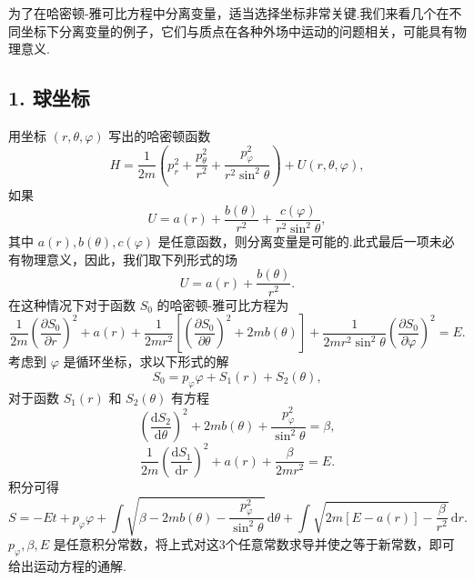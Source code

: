 为了在哈密顿-雅可比方程中分离变量，适当选择坐标非常关键.我们来看几个在不同坐标下分离变量的例子，它们与质点在各种外场中运动的问题相关，可能具有物理意义.

\subsection*{1. 球坐标}

用坐标 $(r,\theta,\varphi)$ 写出的哈密顿函数
\begin{equation*}
  H=\frac{1}{2m}\left(p_r^2+\frac{p_\theta^2}{r^2}
  +\frac{p_\varphi^2}{r^2\sin^2\theta}\right)+U(r,\theta,\varphi),
\end{equation*}
如果
\begin{equation*}
  U=a(r)+\frac{b(\theta)}{r^2}
  +\frac{c(\varphi)}{r^2\sin^2\theta},
\end{equation*}
其中 $a(r),b(\theta),c(\varphi)$
是任意函数，则分离变量是可能的.此式最后一项未必有物理意义，因此，我们取下列形式的场
\begin{equation}
  U=a(r)+\frac{b(\theta)}{r^2}.
\end{equation}
在这种情况下对于函数 $S_0$ 的哈密顿-雅可比方程为
\begin{equation*}
  \frac{1}{2m}\left(\frac{\partial S_0}{\partial r}\right)^2+a(r)
  +\frac{1}{2mr^2}\left[\left(\frac{\partial S_0}{\partial\theta}\right)^2
  +2mb(\theta)\right]
  +\frac{1}{2mr^2\sin^2\theta}\left(\frac{\partial S_0}{\partial\varphi}\right)^2
  =E.
\end{equation*}
考虑到 $\varphi$ 是循环坐标，求以下形式的解
\begin{equation*}
  S_0=p_\varphi\varphi+S_1(r)+S_2(\theta),
\end{equation*}
对于函数 $S_1(r)$ 和 $S_2(\theta)$ 有方程
\begin{equation*}
  \left(\frac{\mathrm{d}S_2}{\mathrm{d}\theta}\right)^2+2mb(\theta)
  +\frac{p_\varphi^2}{\sin^2\theta}=\beta,
\end{equation*}
\begin{equation*}
  \frac{1}{2m}\left(\frac{\mathrm{d}S_1}{\mathrm{d}r}\right)^2+a(r)
  +\frac{\beta}{2mr^2}=E.
\end{equation*}
积分可得
\begin{equation}
  S=-Et+p_\varphi\varphi
  +\int\sqrt{\beta-2mb(\theta)-\frac{p_\varphi^2}{\sin^2\theta}}\,\mathrm{d}\theta
  +\int\sqrt{2m[E-a(r)]-\frac{\beta}{r^2}}\,\mathrm{d}r.
\end{equation}
$p_\varphi,\beta,E$
是任意积分常数，将上式对这3个任意常数求导并使之等于新常数，即可给出运动方程的通解.


